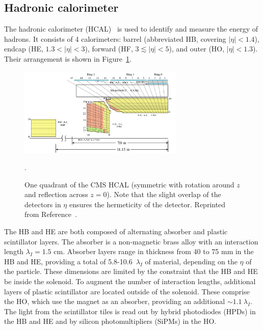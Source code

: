 \subsection{Hadronic calorimeter}

The hadronic calorimeter (HCAL)~\cite{cmshcaltdr,cmspf,cmshcalperf} is used to identify and measure the energy of hadrons.
It consists of 4 calorimeters: barrel (abbreviated HB, covering $|\eta|<1.4$), endcap (HE, $1.3<|\eta|<3$), forward (HF, $3\lesssim|\eta|<5$), and outer (HO, $|\eta|<1.3$).
Their arrangement is shown in Figure~\ref{fig:cms:hcal}.

\begin{figure}[]
\begin{center}
    \includegraphics[width=0.7\textwidth]{figures/cms/hcal.png}
    \caption{One quadrant of the CMS HCAL (symmetric with rotation around $z$ and reflection across $z=0$).
             Note that the slight overlap of the detectors in $\eta$ ensures the hermeticity of the detector.
             Reprinted from Reference~\cite{cmshcalperf}.}
    \label{fig:cms:hcal}.
\end{center}
\end{figure}

The HB and HE are both composed of alternating absorber and plastic scintillator layers.
The absorber is a non-magnetic brass alloy with an interaction length $\lambda_I=1.5$ cm.
Absorber layers range in thickness from 40 to 75 mm in the HB and HE, providing a total of 5.8-10.6~$\lambda_I$ of material, depending on the $\eta$ of the particle.
These dimensions are limited by the constraint that the HB and HE be inside the solenoid. 
To augment the number of interaction lengths, additional layers of plastic scintillator are located outside of the solenoid.
These comprise the HO, which use the magnet as an absorber, providing an additional $\sim 1.1~\lambda_I$.
The light from the scintillator tiles is read out by hybrid photodiodes (HPDs) in the HB and HE and by silicon photomultipliers (SiPMs) in the HO. 

